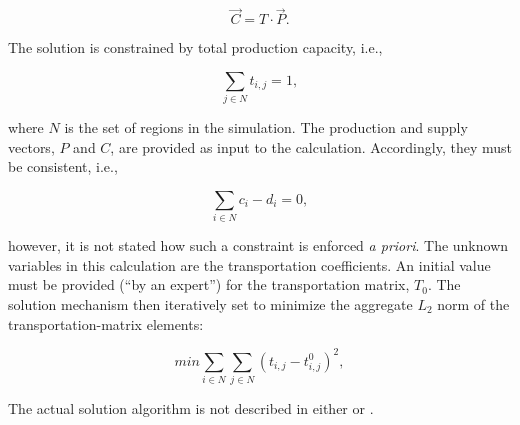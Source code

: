 \begin{equation*}
\vec{C} = T \cdot \vec{P}.
\end{equation*}

The solution is constrained by total production capacity, i.e., 

\begin{equation*}
\sum_{j \in N} t_{i,j} = 1,
\end{equation*}

where $N$ is the set of regions in the simulation. The production and supply
vectors, $P$ and $C$, are provided as input to the calculation. Accordingly,
they must be consistent, i.e.,

\begin{equation*}
\sum_{i \in N} c_i - d_i = 0,
\end{equation*}

however, it is not stated how such a constraint is enforced \textit{a
  priori}. The unknown variables in this calculation are the transportation
coefficients. An initial value must be provided (``by an expert'') for the
transportation matrix, $T_0$. The solution mechanism then iteratively set to
minimize the aggregate $L_2$ norm of the transportation-matrix elements:

\begin{equation*}
min \sum_{i \in N} \sum_{j \in N} \left( t_{i,j} - t_{i,j}^0 \right)^2,
\end{equation*}

The actual solution algorithm is not described in either
\cite{iaea_nuclear_2010} or \cite{andrianova_desae_2008}.
